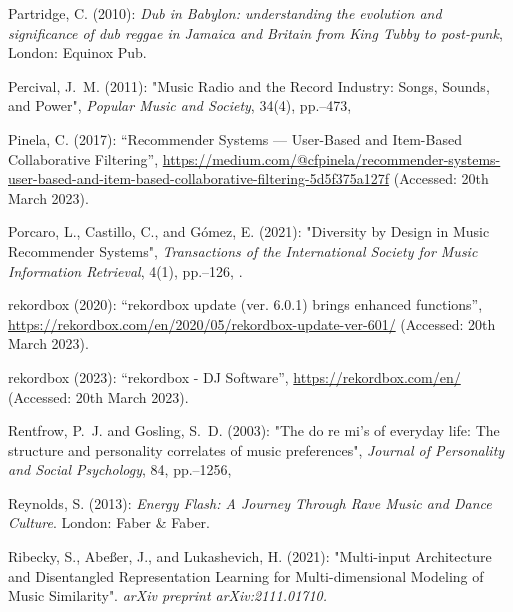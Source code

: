 \documentclass[11pt,titlepage,oneside]{book}
\begin{document}
\begin{thebibliography}{97}
	Partridge, C. (2010): \textit{Dub in {Babylon}: understanding the evolution and
		significance of dub reggae in {Jamaica} and {Britain} from {King} {Tubby} to
		post-punk}, London: Equinox Pub.
	
	Percival, J.~M. (2011): "Music {Radio} and the {Record} {Industry}:
		{Songs}, {Sounds}, and {Power}", \textit{Popular Music and Society}, 34(4),
	pp.--473, 
	
	Pinela, C. (2017): \enquote{Recommender {Systems} — {User}-{Based} and
		{Item}-{Based} {Collaborative} {Filtering}},
	\urlprefix\url{https://medium.com/@cfpinela/recommender-systems-user-based-and-item-based-collaborative-filtering-5d5f375a127f} (Accessed: 20th March 2023).
	
	Porcaro, L., Castillo, C., and Gómez, E. (2021): "Diversity by
		{Design} in {Music} {Recommender} {Systems}", \textit{Transactions of the
		International Society for Music Information Retrieval}, 4(1),
	pp.--126, .
	
	rekordbox (2020): \enquote{rekordbox update (ver. 6.0.1) brings enhanced
		functions},
	\urlprefix\url{https://rekordbox.com/en/2020/05/rekordbox-update-ver-601/} (Accessed: 20th March 2023).
	
	rekordbox (2023): \enquote{rekordbox - {DJ} {Software}},
	\urlprefix\url{https://rekordbox.com/en/} (Accessed: 20th March 2023).
	
	Rentfrow, P.~J. and Gosling, S.~D. (2003): "The do re mi's of everyday
		life: {The} structure and personality correlates of music preferences",
	\textit{Journal of Personality and Social Psychology}, 84, pp.--1256, 
	
	Reynolds, S. (2013): \textit{Energy {Flash}: {A} {Journey} {Through} {Rave}
		{Music} and {Dance} {Culture}}. London: Faber \& Faber.
	
	Ribecky, S., Abeßer, J., and Lukashevich, H. (2021): "Multi-input
		{Architecture} and {Disentangled} {Representation} {Learning} for
		{Multi}-dimensional {Modeling} of {Music} {Similarity}". \textit{arXiv preprint arXiv:2111.01710.}


\end{thebibliography}
\end{document}
